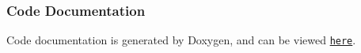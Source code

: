 \subsubsection*{Code Documentation}

Code documentation is generated by Doxygen, and can be viewed \href{/html/index.html}{\tt here}. 